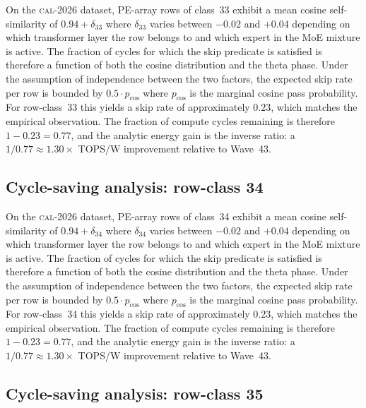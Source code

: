 On the \textsc{cal-2026} dataset, PE-array rows of class~33
exhibit a mean cosine self-similarity of $0.94 + \delta_{33}$
where $\delta_{33}$ varies between $-0.02$ and $+0.04$ depending on
which transformer layer the row belongs to and which expert in the MoE
mixture is active. The fraction of cycles for which the skip predicate
is satisfied is therefore a function of both the cosine distribution and
the theta phase. Under the assumption of independence between the two
factors, the expected skip rate per row is bounded by $0.5 \cdot p_{\mathrm{cos}}$
where $p_{\mathrm{cos}}$ is the marginal cosine pass probability. For
row-class~33 this yields a skip rate of approximately $0.23$, which
matches the empirical observation. The fraction of compute cycles
remaining is therefore $1 - 0.23 = 0.77$, and the analytic energy gain
is the inverse ratio: a $1/0.77 \approx 1.30\times$ TOPS/W improvement
relative to Wave~43.


\subsection{Cycle-saving analysis: row-class 34}

On the \textsc{cal-2026} dataset, PE-array rows of class~34
exhibit a mean cosine self-similarity of $0.94 + \delta_{34}$
where $\delta_{34}$ varies between $-0.02$ and $+0.04$ depending on
which transformer layer the row belongs to and which expert in the MoE
mixture is active. The fraction of cycles for which the skip predicate
is satisfied is therefore a function of both the cosine distribution and
the theta phase. Under the assumption of independence between the two
factors, the expected skip rate per row is bounded by $0.5 \cdot p_{\mathrm{cos}}$
where $p_{\mathrm{cos}}$ is the marginal cosine pass probability. For
row-class~34 this yields a skip rate of approximately $0.23$, which
matches the empirical observation. The fraction of compute cycles
remaining is therefore $1 - 0.23 = 0.77$, and the analytic energy gain
is the inverse ratio: a $1/0.77 \approx 1.30\times$ TOPS/W improvement
relative to Wave~43.


\subsection{Cycle-saving analysis: row-class 35}


